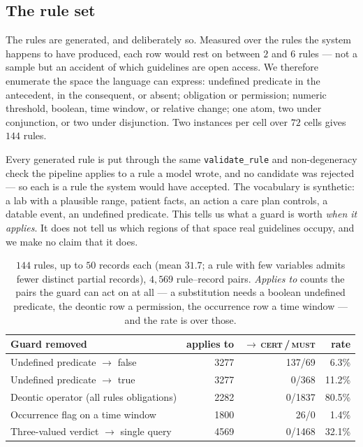 \subsection{The rule set}

The rules are generated, and deliberately so. Measured over the rules the
system happens to have produced, each row would rest on between $2$ and $6$
rules --- not a sample but an accident of which guidelines are open access. We
therefore enumerate the space the language can express: undefined predicate in
the antecedent, in the consequent, or absent; obligation or permission; numeric
threshold, boolean, time window, or relative change; one atom, two under
conjunction, or two under disjunction. Two instances per cell over $72$ cells
gives $144$ rules.

Every generated rule is put through the same \texttt{validate\_rule} and
non-degeneracy check the pipeline applies to a rule a model wrote, and no
candidate was rejected --- so each is a rule the system would have accepted.
The vocabulary is synthetic: a lab with a plausible range, patient facts, an
action a care plan controls, a datable event, an undefined predicate. This
tells us what a guard is worth \emph{when it applies}. It does not tell us
which regions of that space real guidelines occupy, and we make no claim that
it does.

\begin{table}[t]
  \centering
  \caption{$144$ rules, up to $50$ records each (mean $31.7$; a rule with few
  variables admits fewer distinct partial records), $4{,}569$ rule--record
  pairs. \emph{Applies to} counts the pairs the guard can act on at all --- a
  substitution needs a boolean undefined predicate, the deontic row a
  permission, the occurrence row a time window --- and the rate is over those.}
  \label{tab:generated}
  \begin{tabular}{lrrr}
    \toprule
    Guard removed & applies to & $\rightarrow$\,\textsc{cert}\,/\,\textsc{must} & rate \\
    \midrule
    Undefined predicate $\rightarrow$ \textsf{false}   & 3277 & 137/69  & 6.3\% \\
    Undefined predicate $\rightarrow$ \textsf{true}    & 3277 & 0/368   & 11.2\% \\
    Deontic operator (all rules obligations)           & 2282 & 0/1837  & 80.5\% \\
    Occurrence flag on a time window                   & 1800 & 26/0    & 1.4\% \\
    Three-valued verdict $\rightarrow$ single query    & 4569 & 0/1468  & 32.1\% \\
    \bottomrule
  \end{tabular}
\end{table}

